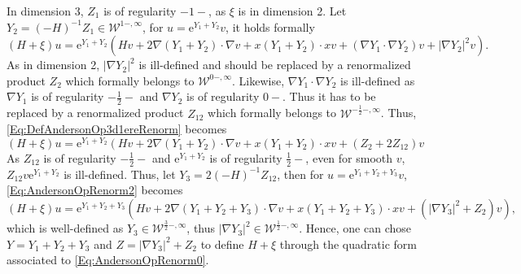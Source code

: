 \documentclass{article}
\def\W{\mathcal W}
\theoremstyle{definition}
\numberwithin{equation}{section}
\newcommand{\e}{\mathrm{e}} %
\begin{document}
In dimension 3, $ Z_1$ is of regularity $-1-$, as $\xi$ is in dimension 2. Let $ Y_2=(-H)^{-1}Z_1\in\W^{1-,\infty}$, for $u=\e^{ Y_1+ Y_2}v$, it holds formally
\begin{equation}\label{Eq:DefAndersonOp3d1ereRenorm}
    (H+\xi)u=\e^{ Y_1+ Y_2}\left(H v + 2\nabla( Y_1+ Y_2)\cdot\nabla{v} + x(Y_1+Y_2)\cdot xv +(\nabla Y_1\cdot\nabla Y_2)v+ |\nabla  Y_2|^2v\right).
\end{equation}
As in dimension 2, $|\nabla  Y_2|^2$ is ill-defined and should be replaced by a renormalized product $ Z_2$ which formally belongs to $\W^{0-,\infty}$. Likewise, $\nabla Y_1\cdot\nabla Y_2$ is ill-defined as $\nabla Y_1$ is of regularity $-\frac{1}{2}-$ and $\nabla Y_2$ is of regularity $0-$. Thus it has to be replaced by a renormalized product $ Z_{12}$ which formally belongs to $\W^{-\frac{1}{2}-,\infty}$. Thus, \cref{Eq:DefAndersonOp3d1ereRenorm} becomes
\begin{equation}\label{Eq:AndersonOpRenorm2}
    (H+\xi)u=\e^{ Y_1+ Y_2}\left(H v + 2\nabla( Y_1+ Y_2)\cdot\nabla{v}+ x(Y_1+Y_2)\cdot xv +(Z_2+2Z_{12})v\right.
\end{equation}
As $Z_{12}$ is of regularity $-\frac{1}{2}-$ and $\e^{ Y_1+ Y_2}$ is of regularity $\frac{1}{2}-$, even for smooth $v$, $Z_{12}v\e^{ Y_1+ Y_2}$ is ill-defined. Thus, let $Y_3=2(-H)^{-1}Z_{12}$, then for $u=\e^{Y_1+Y_2+Y_3}v$, \cref{Eq:AndersonOpRenorm2} becomes
\begin{equation}\label{Eq:AndersonOpRenorm3}
    (H+\xi)u=\e^{ Y_1+ Y_2+Y_3}\left(H v + 2\nabla( Y_1+ Y_2+Y_3)\cdot\nabla{v}+ x(Y_1+Y_2+Y_3)\cdot xv+ \left(|\nabla Y_3|^2+Z_2\right)v\right),
\end{equation}
which is well-defined as $Y_3\in\W^{\frac{3}{2}-,\infty}$, thus $|\nabla Y_3|^2\in\W^{\frac{1}{2}-,\infty}$. Hence, one can chose $Y=Y_1+Y_2+Y_3$ and $Z=|\nabla Y_3|^2+Z_2$ to define $H+\xi$ through the quadratic form associated to \cref{Eq:AndersonOpRenorm0}.\\
\end{document}

